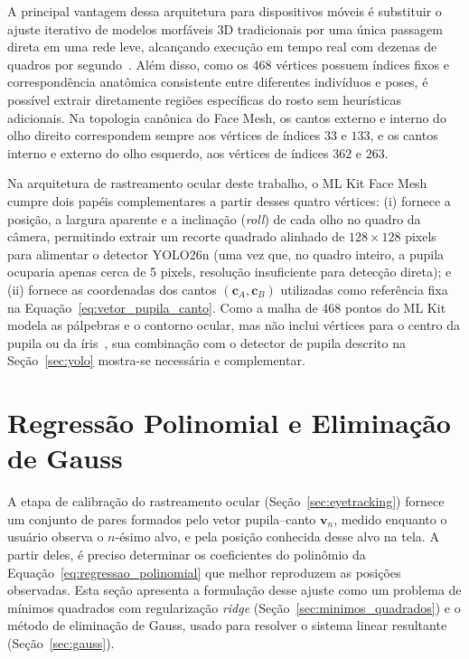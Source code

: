 A principal vantagem dessa arquitetura para dispositivos móveis é substituir o ajuste iterativo de modelos morfáveis 3D tradicionais por uma única passagem direta em uma rede leve, alcançando execução em tempo real com dezenas de quadros por segundo~\cite{kartynnik2019real}. Além disso, como os 468 vértices possuem índices fixos e correspondência anatômica consistente entre diferentes indivíduos e poses, é possível extrair diretamente regiões específicas do rosto sem heurísticas adicionais. Na topologia canônica do Face Mesh, os cantos externo e interno do olho direito correspondem sempre aos vértices de índices $33$ e $133$, e os cantos interno e externo do olho esquerdo, aos vértices de índices $362$ e $263$.

Na arquitetura de rastreamento ocular deste trabalho, o ML Kit Face Mesh cumpre dois papéis complementares a partir desses quatro vértices: (i) fornece a posição, a largura aparente e a inclinação (\textit{roll}) de cada olho no quadro da câmera, permitindo extrair um recorte quadrado alinhado de $128 \times 128$ pixels para alimentar o detector YOLO26n (uma vez que, no quadro inteiro, a pupila ocuparia apenas cerca de 5 pixels, resolução insuficiente para detecção direta); e (ii) fornece as coordenadas dos cantos $(\mathbf{c}_A, \mathbf{c}_B)$ utilizadas como referência fixa na Equação~\ref{eq:vetor_pupila_canto}. Como a malha de 468 pontos do ML Kit modela as pálpebras e o contorno ocular, mas não inclui vértices para o centro da pupila ou da íris~\cite{mlkit_facemesh}, sua combinação com o detector de pupila descrito na Seção~\ref{sec:yolo} mostra-se necessária e complementar.

\section{Regressão Polinomial e Eliminação de Gauss} \label{sec:regressao}

A etapa de calibração do rastreamento ocular (Seção~\ref{sec:eyetracking}) fornece um conjunto de pares formados pelo vetor pupila--canto $\mathbf{v}_n$, medido enquanto o usuário observa o $n$-ésimo alvo, e pela posição conhecida desse alvo na tela. A partir deles, é preciso determinar os coeficientes do polinômio da Equação~\ref{eq:regressao_polinomial} que melhor reproduzem as posições observadas. Esta seção apresenta a formulação desse ajuste como um problema de mínimos quadrados com regularização \textit{ridge} (Seção~\ref{sec:minimos_quadrados}) e o método de eliminação de Gauss, usado para resolver o sistema linear resultante (Seção~\ref{sec:gauss}).

